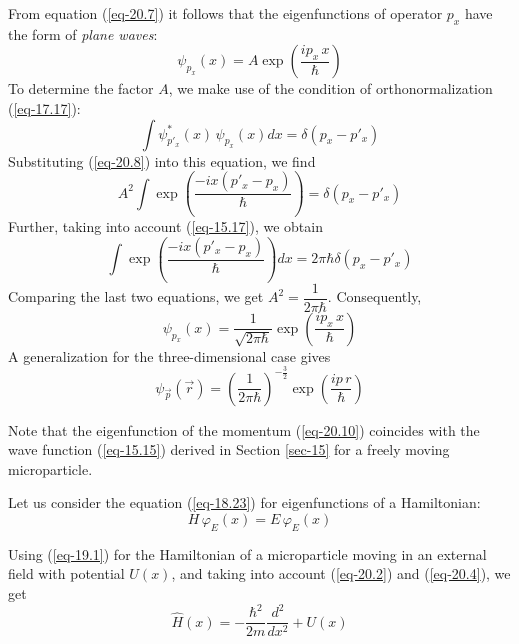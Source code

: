 \documentclass[a4paper,sfsidenotes,colorlinks=true]{tufte-book}
\numberwithin{equation}{section}
\numberwithin{figure}{section}
\begin{document}
From equation (\ref{eq-20.7}) it follows that the eigenfunctions of operator $p_{x}$
have the form of \emph{plane waves}:
\begin{equation}%
\psi_{p_{x}} (x) = A \exp \left( \frac{i p_{x} \,x}{\hbar} \right)
\label{eq-20.8}
\end{equation}
To determine the factor $A$, we make use of the condition of orthonormalization (\ref{eq-17.17}):
\begin{equation*}%
\int \psi^{*}_{p'_{x}} (x) \, \psi_{p_{x}} (x)  dx = \delta (p_{x} - p'_{x})
\end{equation*}
Substituting (\ref{eq-20.8}) into this equation, we find
\begin{equation*}%
A^{2} \int \exp \left( \frac{-i x (p'_{x} - p_{x})}{\hbar} \right) = \delta (p_{x} - p'_{x})
\end{equation*}
Further, taking into account (\ref{eq-15.17}), we obtain 
\begin{equation*}%
 \int \exp \left( \frac{-i x (p'_{x} - p_{x})}{\hbar} \right) dx  = 2
 \pi \hbar \delta (p_{x} - p'_{x})
\end{equation*}
Comparing the last two equations, we get
$A^{2} = \dfrac{1}{2 \pi \hbar}$. Consequently,
\begin{equation}%
\psi_{p_{x}} (x) = \dfrac{1}{\sqrt{2 \pi \hbar}} \exp \left( \frac{i p_{x} \,x}{\hbar} \right)
\label{eq-20.9}
\end{equation}
A generalization for the three-dimensional case gives 
\begin{equation}%
\psi_{\vec{p}} (\vec{r}) = \left( \dfrac{1}{2 \pi \hbar} \right)^{-\frac{3}{2}}  \exp \left( \frac{i p \,r}{\hbar} \right)
\label{eq-20.10}
\end{equation}

Note that the eigenfunction of the momentum (\ref{eq-20.10}) coincides
with the wave function (\ref{eq-15.15}) derived in Section \ref{sec-15} for a
freely moving microparticle.

Let us  consider the equation
(\ref{eq-18.23}) for eigenfunctions of a Hamiltonian:
\begin{equation}%
H \, \varphi_{E} (x) = E \, \varphi_{E} (x)
\label{eq-20.11}
\end{equation}

Using (\ref{eq-19.1}) for the Hamiltonian of a microparticle moving in
an external field with potential $U (x)$, and taking into account
(\ref{eq-20.2}) and (\ref{eq-20.4}), we get
\begin{equation}%
\hat{H}(x)  = - \frac{\hbar^{2}}{2m} \frac{d^{2}}{dx^{2}} + U(x)
\label{eq-20.12}
\end{equation}
\end{document}
